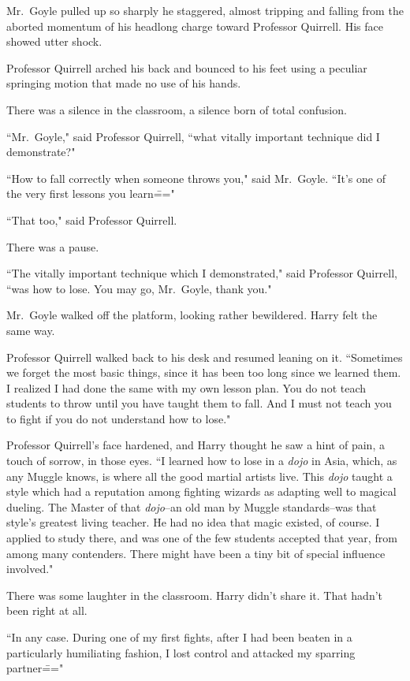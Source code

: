 Mr.~Goyle pulled up so sharply he staggered, almost tripping and falling from the aborted momentum of his headlong charge toward Professor Quirrell. His face showed utter shock.

Professor Quirrell arched his back and bounced to his feet using a peculiar springing motion that made no use of his hands.

There was a silence in the classroom, a silence born of total confusion.

``Mr.~Goyle," said Professor Quirrell, ``what vitally important technique did I demonstrate?"

``How to fall correctly when someone throws you," said Mr.~Goyle. ``It's one of the very first lessons you learn\==="

``That too," said Professor Quirrell.

There was a pause.

``The vitally important technique which I demonstrated," said Professor Quirrell, ``was how to lose. You may go, Mr.~Goyle, thank you."

Mr.~Goyle walked off the platform, looking rather bewildered. Harry felt the same way.

Professor Quirrell walked back to his desk and resumed leaning on it. ``Sometimes we forget the most basic things, since it has been too long since we learned them. I realized I had done the same with my own lesson plan. You do not teach students to throw until you have taught them to fall. And I must not teach you to fight if you do not understand how to lose."

Professor Quirrell's face hardened, and Harry thought he saw a hint of pain, a touch of sorrow, in those eyes. ``I learned how to lose in a \emph{dojo} in Asia, which, as any Muggle knows, is where all the good martial artists live. This \emph{dojo} taught a style which had a reputation among fighting wizards as adapting well to magical dueling. The Master of that \emph{dojo}\---an old man by Muggle standards\---was that style's greatest living teacher. He had no idea that magic existed, of course. I applied to study there, and was one of the few students accepted that year, from among many contenders. There might have been a tiny bit of special influence involved."

There was some laughter in the classroom. Harry didn't share it. That hadn't been right at all.

``In any case. During one of my first fights, after I had been beaten in a particularly humiliating fashion, I lost control and attacked my sparring partner\==="

